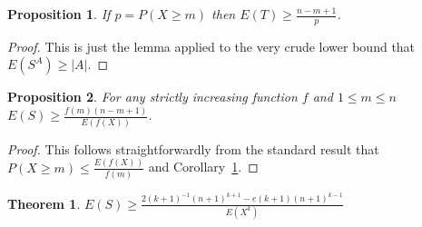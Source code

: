 \documentclass[a4paper]{book}
\newtheorem{proposition}{Proposition}[section]
\newtheorem{theorem}{Theorem}[section]
\begin{document}
\begin{proposition}\label{prop:coupontail}
If \(p = P(X \geq m)\) then \(E(T) \geq \frac{n - m + 1}{p}\).
\end{proposition}

\begin{proof}
This is just the lemma applied to the very crude lower bound that \(E(S^A) \geq |A|\).
\end{proof}

\begin{proposition}\label{prop:couponestimate}
For any strictly increasing function \(f\) and \(1 \leq m \leq n\)
\(E(S) \geq \frac{f(m) (n - m + 1)}{E(f(X))}\).
\end{proposition}

\begin{proof}
This follows straightforwardly from the standard result that \(P(X \geq m) \leq \frac{E(f(X))}{f(m)}\) and Corollary~\ref{prop:coupontail}.
\end{proof}

\begin{theorem}
\(E(S) \geq \frac{2 {(k + 1)}^{-1} {(n + 1)}^{k + 1} - e (k + 1) {(n + 1)}^{k - 1}}{E(X^k)}\)
\end{theorem}
\end{document}
